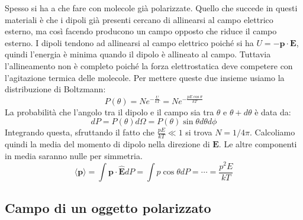\documentclass{article}
\newcommand{\mbf}{\mathbf}
\newcommand{\vers}[1]{\mbf{\hat #1 }}
\numberwithin{equation}{section}
\begin{document}
Spesso si ha a che fare con molecole già polarizzate. Quello che succede in questi materiali è che i dipoli già presenti cercano di allinearsi al campo elettrico esterno, ma così facendo producono un campo opposto che riduce il campo esterno. I dipoli tendono ad allinearsi al campo elettrico poiché si ha $U = - \mbf p \cdot \mbf E$, quindi l'energia è minima quando il dipolo è allineato al campo. Tuttavia l'allineamento non è completo poiché la forza elettrostatica deve competere con l'agitazione termica delle molecole. Per mettere queste due insieme usiamo la distribuzione di Boltzmann:
\begin{equation}
    P(\theta) = N e^{-\frac{ U }{ kT } } = N e^{-\frac{ p E \cos \theta }{ kT } }
\end{equation}
La probabilità che l'angolo tra il dipolo e il campo sia tra $\theta$ e $\theta + d\theta$ è data da:
\begin{equation}
    dP = P(\theta) d\Omega = P(\theta) \sin \theta d\theta d\phi
\end{equation}
Integrando questa, sfruttando il fatto che $\frac{ pE }{ kT } \ll 1$ si trova $N = 1/4\pi$.
Calcoliamo quindi la media del momento di dipolo nella direzione di $\mbf E$. Le altre componenti in media saranno nulle per simmetria.
\begin{equation}
    \langle \mbf p \rangle = \int \mbf p \cdot \vers E dP = \int p \cos \theta dP = \cdots = \frac{ p^2 E }{ kT } 
\end{equation}


\subsection{Campo di un oggetto polarizzato} %
\label{sub:campo_di_un_oggetto_polarizzato}
\end{document}
